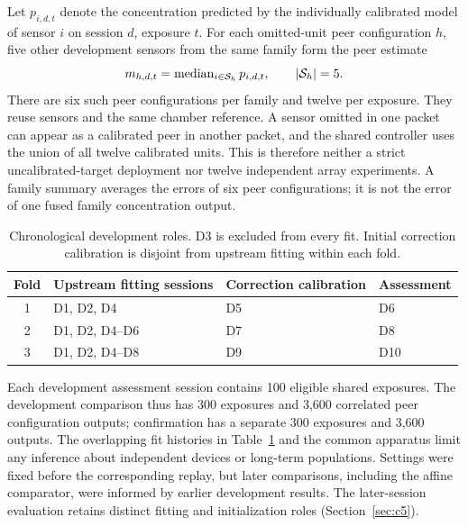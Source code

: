 Let $p_{i,d,t}$ denote the concentration predicted by the individually calibrated model of sensor $i$ on session $d$, exposure $t$. For each omitted-unit peer configuration $h$, five other development sensors from the same family form the peer estimate
\begin{equation}
m_{h,d,t}=\operatorname{median}_{i\in\mathcal S_h}p_{i,d,t},\qquad |\mathcal S_h|=5.
\label{eq:median}
\end{equation}
There are six such peer configurations per family and twelve per exposure. They reuse sensors and the same chamber reference. A sensor omitted in one packet can appear as a calibrated peer in another packet, and the shared controller uses the union of all twelve calibrated units. This is therefore neither a strict uncalibrated-target deployment nor twelve independent array experiments. A family summary averages the errors of six peer configurations; it is not the error of one fused family concentration output.

\begin{table}[H]
\centering\small
\caption{Chronological development roles. D3 is excluded from every fit. Initial correction calibration is disjoint from upstream fitting within each fold.}\label{tab:roles}
\begin{tabular}{clll}
\toprule
Fold & Upstream fitting sessions & Correction calibration & Assessment \\
\midrule
1 & D1, D2, D4 & D5 & D6 \\
2 & D1, D2, D4--D6 & D7 & D8 \\
3 & D1, D2, D4--D8 & D9 & D10 \\
\bottomrule
\end{tabular}
\end{table}

Each development assessment session contains 100 eligible shared exposures. The development comparison thus has 300 exposures and 3,600 correlated peer configuration outputs; confirmation has a separate 300 exposures and 3,600 outputs. The overlapping fit histories in Table~\ref{tab:roles} and the common apparatus limit any inference about independent devices or long-term populations. Settings were fixed before the corresponding replay, but later comparisons, including the affine comparator, were informed by earlier development results. The later-session evaluation retains distinct fitting and initialization roles (Section~\ref{sec:c5}).
